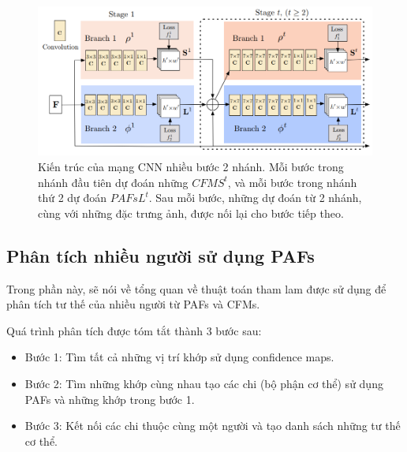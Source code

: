 \FloatBarrier
\begin{figure}[htp]
\begin{center}
\includegraphics[scale=0.45]{chap3/c3_figs/structure.png}
\end{center}
\caption{Kiến trúc của mạng CNN nhiều bước 2 nhánh. Mỗi bước trong nhánh đầu tiên dự đoán những $CFM S^{t}$, và mỗi bước trong nhánh thứ 2 dự đoán $PAFs L^{t}$. Sau mỗi bước, những dự đoán từ 2 nhánh, cùng với những đặc trưng ảnh, được nối lại cho bước tiếp theo.}
\label{fig:structure}
\end{figure}
\FloatBarrier

\subsection{Phân tích nhiều người sử dụng PAFs}
\label{ss:Multi-Person Parsing using PAFs}

Trong phần này, sẽ nói về tổng quan về thuật toán tham lam được sử dụng để phân tích tư thế của nhiều người từ PAFs và CFMs.

Quá trình phân tích được tóm tắt thành 3 bước sau:
\begin{itemize}
\item Bước 1: Tìm tất cả những vị trí khớp sử dụng confidence maps.
\item Bước 2: Tìm những khớp cùng nhau tạo các chi (bộ phận cơ thể) sử dụng PAFs và những khớp trong bước 1.
\item Bước 3: Kết nối các chi thuộc cùng một người và tạo danh sách những tư thế cơ thể.
\end{itemize}

